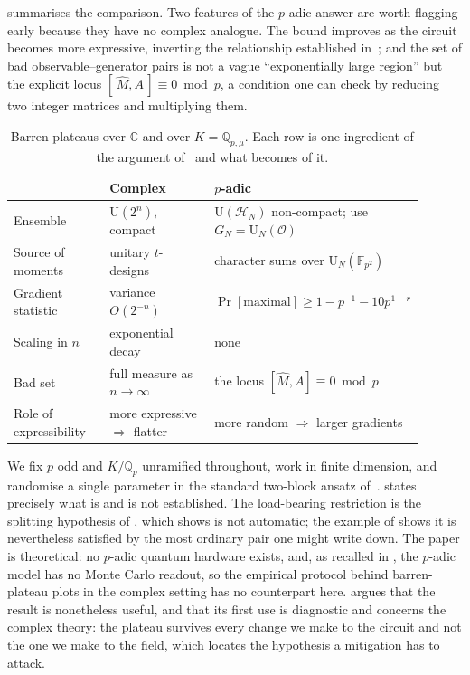 \documentclass{ceurart}
\theoremstyle{plain}
\theoremstyle{definition}
\theoremstyle{remark}
\theoremstyle{plain}
\newcommand{\Qp}{\mathbb{Q}_p}
\newcommand{\Qpmu}{\mathbb{Q}_{p,\mu}}
\newcommand{\HH}{\mathcal{H}}
\newcommand{\OK}{\mathcal{O}}
\newcommand{\Uni}{\mathrm{U}}
\newcommand{\FF}{\mathbb{F}}
\begin{document}
 summarises the comparison. Two features of the $p$-adic
answer are worth flagging early because they have no complex analogue. The
bound improves as the circuit becomes more expressive, inverting the
relationship established in~\cite{Ho22}; and the set of bad
observable--generator pairs is not a vague ``exponentially large region'' but
the explicit locus $[\,\widehat M,A\,]\equiv0\bmod p$, a condition one can check
by reducing two integer matrices and multiplying them.

\begin{table}[t]
\caption{Barren plateaus over $\mathbb{C}$ and over $K=\Qpmu$. Each row is one
  ingredient of the argument of~\cite{Mc18} and what becomes of it.}
\label{tab:compare}
\centering
\small
\begin{tabular}{@{}p{0.26\linewidth}p{0.32\linewidth}p{0.32\linewidth}@{}}
\toprule
 & \textbf{Complex} & \textbf{$p$-adic} \\
\midrule
Ensemble & $\mathrm{U}(2^{n})$, compact & $\Uni(\HH_N)$ non-compact; use
  $G_N=\Uni_N(\OK)$ \\
Source of moments & unitary $t$-designs & character sums over
  $\Uni_N(\FF_{p^2})$ \\
Gradient statistic & variance $O(2^{-n})$ & $\Pr[\text{maximal}]\ge
  1-p^{-1}-10p^{1-r}$ \\
Scaling in $n$ & exponential decay & none \\
Bad set & full measure as $n\to\infty$ & the locus
  $[\widehat M,A]\equiv0\bmod p$ \\
Role of expressibility & more expressive $\Rightarrow$ flatter~\cite{Ho22} &
  more random $\Rightarrow$ larger gradients \\
\bottomrule
\end{tabular}
\end{table}
 We fix $p$ odd and $K/\Qp$ unramified throughout, work in
finite dimension, and randomise a single parameter in the standard two-block
ansatz of~\cite{Mc18}.  states precisely what is and is
not established. The load-bearing restriction is the splitting hypothesis of
, which  shows is not automatic; the
example of  shows it is nevertheless satisfied by the most
ordinary pair one might write down. The paper is theoretical: no $p$-adic
quantum hardware exists, and, as recalled in , the
$p$-adic model has no Monte Carlo readout, so the empirical protocol behind
barren-plateau plots in the complex setting has no counterpart here.
 argues that the result is nonetheless useful, and that its
first use is diagnostic and concerns the complex theory: the plateau survives
every change we make to the circuit and not the one we make to the field, which
locates the hypothesis a mitigation has to attack.
\end{document}
